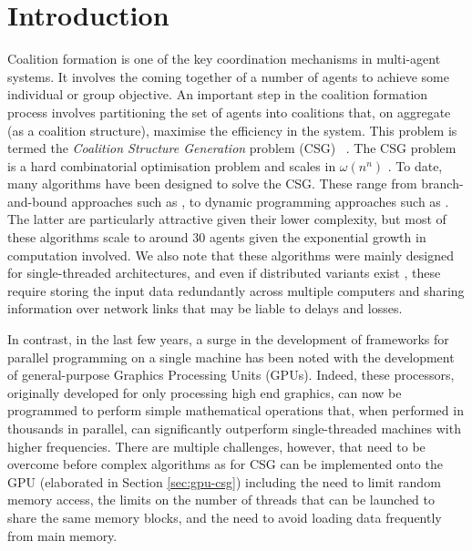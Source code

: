 \documentclass[a4paper, 12pt]{report}
\begin{document}
\section{Introduction}
\noindent Coalition formation is one of the key coordination mechanisms in
multi-agent systems. It involves the coming together of a number of  agents to
achieve some individual or group objective.  An important step in the 
 coalition formation process involves partitioning the set of agents into
coalitions that, on aggregate (as a coalition structure), maximise the
efficiency in the system. This problem is termed the 
\emph{Coalition Structure Generation} problem (CSG)
~\cite{DBLP:journals/ai/SandholmLAST99}.   The  CSG problem is a hard
combinatorial optimisation problem and scales in $\omega(n^n)$
\cite{DBLP:journals/ai/SandholmLAST99}. To date, many algorithms have been
designed to solve the CSG. These range from branch-and-bound approaches such as
\cite{rahwan2009anytime}, to dynamic programming approaches such as
\cite{DBLP:conf/atal/RahwanJ08,rahwan:jennings:2008b}. The latter are
particularly attractive given their lower complexity, but most of these
algorithms scale to around 30 agents given the exponential growth in computation
involved. We also note that these algorithms were mainly designed for
single-threaded architectures, and even if distributed variants exist
\cite{michalak2010distributed}, these require storing the input data redundantly
across multiple computers and sharing information over network links that may be
liable to delays and losses. 

In contrast, in the last few years, a surge in the development of frameworks for
parallel programming on a single machine has been noted with the development of
general-purpose Graphics Processing Units (GPUs). Indeed, these processors,
originally developed for only processing high end graphics, can now be
programmed to perform simple mathematical operations that, when performed in
thousands in parallel, can significantly outperform single-threaded machines
with higher frequencies. There are multiple challenges,
however, that need to be overcome before complex algorithms as for CSG can be
implemented onto the GPU (elaborated in Section \ref{sec:gpu-csg})
including the need to limit random memory access,  the limits on the number of
threads that can be launched to share the same memory blocks, and the need to
avoid loading data frequently from main memory. 
\end{document}
